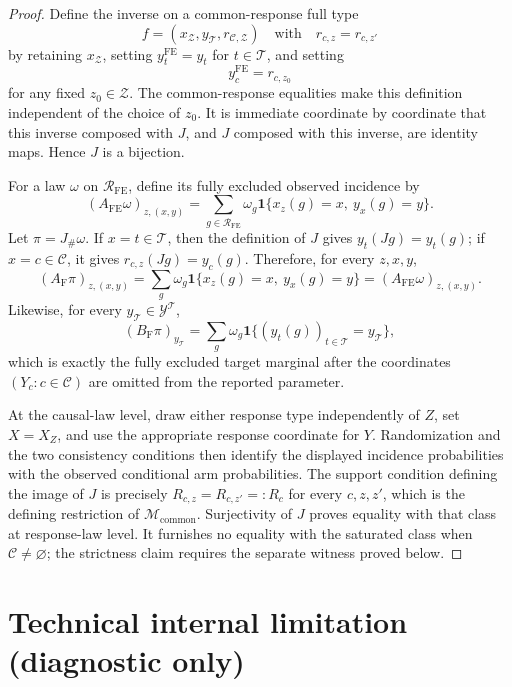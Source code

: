 \documentclass{article}
\begin{document}
\begin{proof}
Define the inverse on a common-response full type
\[
f=(x_{\mathcal Z},y_{\mathcal T},r_{\mathcal C,\mathcal Z})
\quad\text{with}\quad
r_{c,z}=r_{c,z'}
\]
by retaining \(x_{\mathcal Z}\), setting \(y_t^{\mathrm{FE}}=y_t\) for \(t\in\mathcal T\), and setting
\[
y_c^{\mathrm{FE}}=r_{c,z_0}
\]
for any fixed \(z_0\in\mathcal Z\).  The common-response equalities make this definition independent of the choice of \(z_0\).  It is immediate coordinate by coordinate that this inverse composed with \(J\), and \(J\) composed with this inverse, are identity maps.  Hence \(J\) is a bijection.

For a law \(\omega\) on \(\mathcal R_{\mathrm{FE}}\), define its fully excluded observed incidence by
\[
(A_{\mathrm{FE}}\omega)_{z,(x,y)}
=\sum_{g\in\mathcal R_{\mathrm{FE}}}
\omega_g\mathbf 1\{x_z(g)=x,\ y_x(g)=y\}.
\]
Let \(\pi=J_{\#}\omega\).  If \(x=t\in\mathcal T\), then the definition of \(J\) gives \(y_t(Jg)=y_t(g)\); if \(x=c\in\mathcal C\), it gives \(r_{c,z}(Jg)=y_c(g)\).  Therefore, for every \(z,x,y\),
\[
(A_{\mathrm F}\pi)_{z,(x,y)}
=\sum_g\omega_g\mathbf 1\{x_z(g)=x,\ y_x(g)=y\}
=(A_{\mathrm{FE}}\omega)_{z,(x,y)}.
\]
Likewise, for every \(y_{\mathcal T}\in\mathcal Y^{\mathcal T}\),
\[
(B_{\mathrm F}\pi)_{y_{\mathcal T}}
=\sum_g\omega_g
\mathbf 1\{(y_t(g))_{t\in\mathcal T}=y_{\mathcal T}\},
\]
which is exactly the fully excluded target marginal after the coordinates \((Y_c:c\in\mathcal C)\) are omitted from the reported parameter.

At the causal-law level, draw either response type independently of \(Z\), set \(X=X_Z\), and use the appropriate response coordinate for \(Y\).  Randomization and the two consistency conditions then identify the displayed incidence probabilities with the observed conditional arm probabilities.  The support condition defining the image of \(J\) is precisely \(R_{c,z}=R_{c,z'}=:R_c\) for every \(c,z,z'\), which is the defining restriction of \(\mathcal M_{\mathrm{common}}\).  Surjectivity of \(J\) proves equality with that class at response-law level.  It furnishes no equality with the saturated class when \(\mathcal C\ne\varnothing\); the strictness claim requires the separate witness proved below.
\end{proof}

\section*{Technical internal limitation (diagnostic only)}
\end{document}
